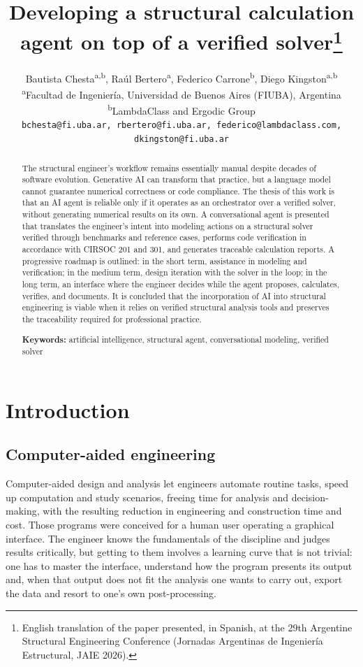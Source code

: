 \documentclass[11pt,a4paper]{article}
\title{Developing a structural calculation agent on top of a verified solver\thanks{English translation of the paper presented, in Spanish, at the 29th Argentine Structural Engineering Conference (Jornadas Argentinas de Ingeniería Estructural, JAIE 2026).}}
\author{Bautista Chesta\textsuperscript{a,b}, Raúl Bertero\textsuperscript{a}, Federico Carrone\textsuperscript{b}, Diego Kingston\textsuperscript{a,b}\\[0.6em]
\normalsize \textsuperscript{a}Facultad de Ingeniería, Universidad de Buenos Aires (FIUBA), Argentina\\
\textsuperscript{b}LambdaClass and Ergodic Group\\[0.4em]
\small\texttt{bchesta@fi.uba.ar, rbertero@fi.uba.ar, federico@lambdaclass.com, dkingston@fi.uba.ar}}
\date{}
\begin{document}
\maketitle

\begin{abstract}
The structural engineer's workflow remains essentially manual despite decades of software evolution. Generative AI can transform that practice, but a language model cannot guarantee numerical correctness or code compliance. The thesis of this work is that an AI agent is reliable only if it operates as an orchestrator over a verified solver, without generating numerical results on its own. A conversational agent is presented that translates the engineer's intent into modeling actions on a structural solver verified through benchmarks and reference cases, performs code verification in accordance with CIRSOC 201 and 301, and generates traceable calculation reports. A progressive roadmap is outlined: in the short term, assistance in modeling and verification; in the medium term, design iteration with the solver in the loop; in the long term, an interface where the engineer decides while the agent proposes, calculates, verifies, and documents. It is concluded that the incorporation of AI into structural engineering is viable when it relies on verified structural analysis tools and preserves the traceability required for professional practice.

\medskip
\noindent\textbf{Keywords:} artificial intelligence, structural agent, conversational modeling, verified solver
\end{abstract}

\section{Introduction}\label{sec:1}

\subsection{Computer-aided engineering}\label{sec:1.1}

Computer-aided design and analysis let engineers automate routine tasks, speed up computation and study scenarios, freeing time for analysis and decision-making, with the resulting reduction in engineering and construction time and cost. Those programs were conceived for a human user operating a graphical interface. The engineer knows the fundamentals of the discipline and judges results critically, but getting to them involves a learning curve that is not trivial: one has to master the interface, understand how the program presents its output and, when that output does not fit the analysis one wants to carry out, export the data and resort to one's own post-processing.
\end{document}
